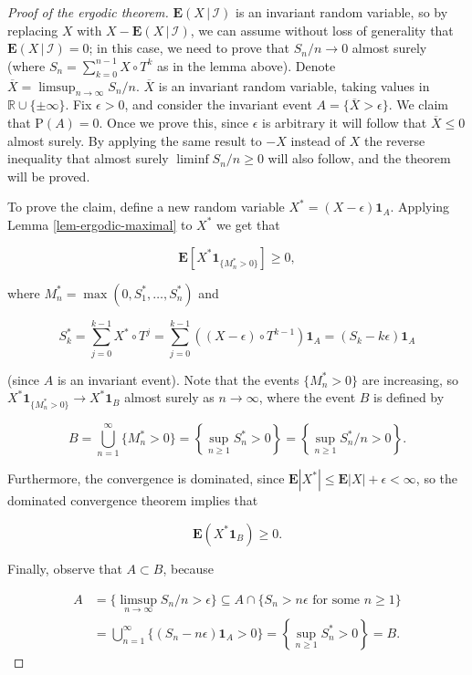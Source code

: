 \documentclass[11pt]{report}
\newcommand{\R}{\mathbb{R}}
\theoremstyle{plain}
\theoremstyle{definition}
\begin{document}
\begin{proof}[Proof of the ergodic theorem]
$\mathbf{E}\left(X\,|\,\mathcal{I}\right)$ is an invariant random variable, so by replacing $X$ with $X-\mathbf{E}\left(X\,|\,\mathcal{I}\right)$, we can assume without loss of generality that $\mathbf{E}\left(X\,|\,\mathcal{I}\right)=0$; in this case, we need to prove that $S_n/n\to 0$ almost surely (where $S_n=\sum_{k=0}^{n-1} X\circ T^k$ as in the lemma above). Denote $\overline{X} = \limsup_{n\to\infty} S_n/n$. $\overline{X}$ is an invariant random variable, taking values in $\R\cup\{\pm\infty\}$. Fix $\epsilon>0$, and consider the invariant event $A= \{ \overline{X} > \epsilon \}$. We claim that $\mathrm{P}(A)=0$. Once we prove this, since $\epsilon$ is arbitrary it will follow that $\overline{X}\le 0$ almost surely. By applying the same result to $-X$ instead of $X$ the reverse inequality that almost surely $\liminf S_n/n\ge 0$ will also follow, and the theorem will be proved.

To prove the claim, define a new random variable $X^* = (X-\epsilon)\mathbf{1}_{A}$. Applying Lemma \ref{lem-ergodic-maximal} to $X^*$ we get that

\[
\mathbf{E}\left[X^* \mathbf{1}_{\{ M_n^*>0\}}\right] \ge 0,
\]

where $M_n^* = \max(0,S_1^*,\ldots,S_n^*)$ and

\[
S_k^* = \sum_{j=0}^{k-1} X^*\circ T^j = \sum_{j=0}^{k-1} \left((X-\epsilon)\circ T^{k-1}\right) \mathbf{1}_A = (S_k-k\epsilon)\mathbf{1}_A
\]

(since $A$ is an invariant event). Note that the events $\{M_n^* > 0\}$ are increasing, so $X^* \mathbf{1}_{\{ M_n^*>0\}} \to X^* \mathbf{1}_B$ almost surely as $n\to\infty$, where the event $B$ is defined by

\[
B=\bigcup_{n=1}^\infty \{M_n^* > 0 \} =
\left\{ \sup_{n\ge 1} S_n^* > 0 \right\}
= \left\{ \sup_{n\ge 1} S_n^*/n > 0 \right\}.
\]

Furthermore, the convergence is dominated, since $\mathbf{E}|X^*| \le \mathbf{E}|X|+\epsilon<\infty$, so the dominated convergence theorem implies that

\[
\mathbf{E}(X^* \mathbf{1}_B) \ge 0.
\]

Finally, observe that $A\subset B$, because

\begin{align*}
A&=\{\limsup_{n\to\infty} S_n/n>\epsilon\} \subseteq A \cap \{ S_n>n\epsilon \textrm{ for some }n\ge 1\} \\
&= \bigcup_{n=1}^\infty \{ (S_n-n\epsilon)\mathbf{1}_A > 0 \} = \left\{ \sup_{n\ge 1} S_n^*>0 \right\} = B.
\end{align*}


\end{proof}
\end{document}
